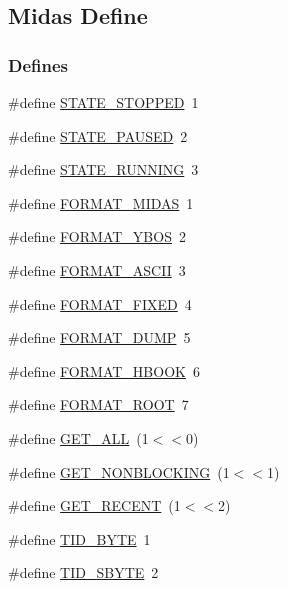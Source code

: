 \subsection{Midas Define}
\label{group__mdefineh}
\subsubsection*{Defines}
\begin{DoxyCompactItemize}
\item 
\#define \hyperlink{group__mdefineh_ga6a8dac64367bd381245f2eb09a7fe919}{STATE\_\-STOPPED}~1
\item 
\#define \hyperlink{group__mdefineh_gab08c47284371c683ba80d6b3244400f1}{STATE\_\-PAUSED}~2
\item 
\#define \hyperlink{group__mdefineh_gac4c0304c569818c811515e24523c3150}{STATE\_\-RUNNING}~3
\item 
\#define \hyperlink{group__mdefineh_gac7ef5b0cbb1fc1d26c3bfd4cc4a191a9}{FORMAT\_\-MIDAS}~1
\item 
\#define \hyperlink{group__mdefineh_gaab9657af955d54be6cd05e0a726ad964}{FORMAT\_\-YBOS}~2
\item 
\#define \hyperlink{group__mdefineh_gaf900017aedf1bdc7e50fcbf949464e6d}{FORMAT\_\-ASCII}~3
\item 
\#define \hyperlink{group__mdefineh_ga44835dd4c169e13e0fedf8c01a54dc2b}{FORMAT\_\-FIXED}~4
\item 
\#define \hyperlink{group__mdefineh_gaffaf04a985dfa6ff43ab39a8c6e3f0a7}{FORMAT\_\-DUMP}~5
\item 
\#define \hyperlink{group__mdefineh_gac3a857e4820ecdaa22f9a66a560dccad}{FORMAT\_\-HBOOK}~6
\item 
\#define \hyperlink{group__mdefineh_ga9663ae12f7cbf4295b3804ebd335e408}{FORMAT\_\-ROOT}~7
\item 
\#define \hyperlink{group__mdefineh_ga16218704fdf35f7624064c9d1d4bc78f}{GET\_\-ALL}~(1$<$$<$0)
\item 
\#define \hyperlink{group__mdefineh_ga0c91e56af17a9a23f5adab8a4099fac6}{GET\_\-NONBLOCKING}~(1$<$$<$1)
\item 
\#define \hyperlink{group__mdefineh_ga3275482a8a2223e4d57ac51d967979f8}{GET\_\-RECENT}~(1$<$$<$2)
\item 
\#define \hyperlink{group__mdefineh_ga7499d3aa0ca98d255f5147494ab4f572}{TID\_\-BYTE}~1
\item 
\#define \hyperlink{group__mdefineh_ga150e3437f490b1e7c0e11046a9ead174}{TID\_\-SBYTE}~2
\item 
$$
\end{DoxyCompactItemize}
